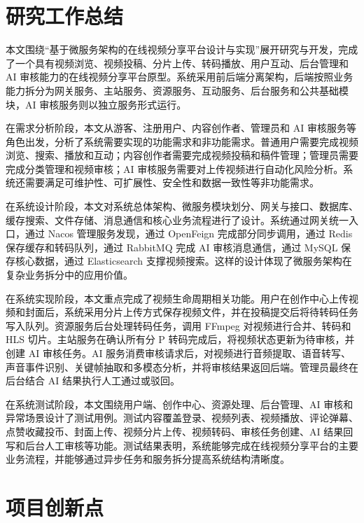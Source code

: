 \section{研究工作总结}
\label{sec:research-summary}

本文围绕“基于微服务架构的在线视频分享平台设计与实现”展开研究与开发，完成了一个具有视频浏览、视频投稿、分片上传、转码播放、用户互动、后台管理和 AI 审核能力的在线视频分享平台原型。系统采用前后端分离架构，后端按照业务能力拆分为网关服务、主站服务、资源服务、互动服务、后台服务和公共基础模块，AI 审核服务则以独立服务形式运行。

在需求分析阶段，本文从游客、注册用户、内容创作者、管理员和 AI 审核服务等角色出发，分析了系统需要实现的功能需求和非功能需求。普通用户需要完成视频浏览、搜索、播放和互动；内容创作者需要完成视频投稿和稿件管理；管理员需要完成分类管理和视频审核；AI 审核服务需要对上传视频进行自动化风险分析。系统还需要满足可维护性、可扩展性、安全性和数据一致性等非功能需求。

在系统设计阶段，本文对系统总体架构、微服务模块划分、网关与接口、数据库、缓存搜索、文件存储、消息通信和核心业务流程进行了设计。系统通过网关统一入口，通过 Nacos 管理服务发现，通过 OpenFeign 完成部分同步调用，通过 Redis 保存缓存和转码队列，通过 RabbitMQ 完成 AI 审核消息通信，通过 MySQL 保存核心数据，通过 Elasticsearch 支撑视频搜索。这样的设计体现了微服务架构在复杂业务拆分中的应用价值\cite{lewis2014microservices}。

在系统实现阶段，本文重点完成了视频生命周期相关功能。用户在创作中心上传视频和封面后，系统采用分片上传方式保存视频文件，并在投稿提交后将待转码任务写入队列。资源服务后台处理转码任务，调用 FFmpeg 对视频进行合并、转码和 HLS 切片。主站服务在确认所有分 P 转码完成后，将视频状态更新为待审核，并创建 AI 审核任务。AI 服务消费审核请求后，对视频进行音频提取、语音转写、声音事件识别、关键帧抽取和多模态分析，并将审核结果返回后端。管理员最终在后台结合 AI 结果执行人工通过或驳回。

在系统测试阶段，本文围绕用户端、创作中心、资源处理、后台管理、AI 审核和异常场景设计了测试用例。测试内容覆盖登录、视频列表、视频播放、评论弹幕、点赞收藏投币、封面上传、视频分片上传、视频转码、审核任务创建、AI 结果回写和后台人工审核等功能。测试结果表明，系统能够完成在线视频分享平台的主要业务流程，并能够通过异步任务和服务拆分提高系统结构清晰度。

\section{项目创新点}
\label{sec:project-innovation}


